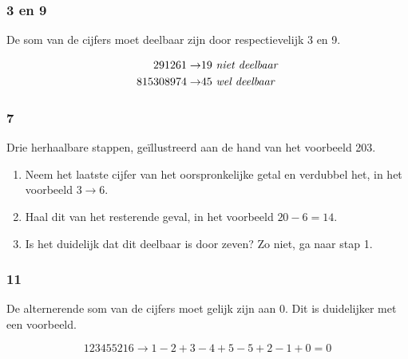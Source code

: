 \documentclass[10pt,hidelinks]{article}
\begin{document}
\subsubsection{3 en 9}

De som van de cijfers moet deelbaar zijn door respectievelijk 3 en 9.

\begin{align*}
	291261 \to & 19 \text{ \emph{niet deelbaar}} \\
	815308974 \to & 45 \text{ \emph{wel deelbaar}}
\end{align*}

\subsubsection{7}

Drie herhaalbare stappen, ge\"illustreerd aan de hand van het voorbeeld 203.

\begin{enumerate}
	\item Neem het laatste cijfer van het oorspronkelijke getal en verdubbel het, in het voorbeeld $3 \to 6$.
	\item Haal dit van het resterende geval, in het voorbeeld $20 - 6 = 14$.
	\item Is het duidelijk dat dit deelbaar is door zeven? Zo niet, ga naar stap 1.
\end{enumerate}

\subsubsection{11}

De alternerende som van de cijfers moet gelijk zijn aan 0. Dit is duidelijker met een voorbeeld.

\[123455216 \to 1 - 2 + 3 - 4 + 5 - 5 + 2 - 1 + 0 = 0\]
\end{document}
